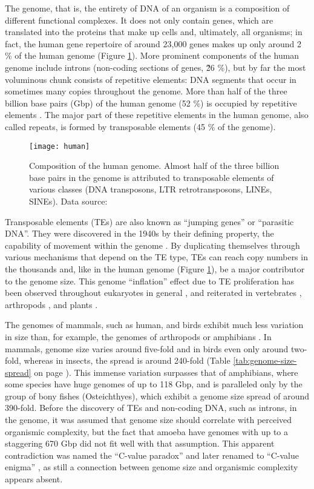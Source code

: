 The genome, that is, the entirety of DNA of an organism is a composition
of different functional complexes. It does not only contain genes, which
are translated into the proteins that make up cells and, ultimately, all
organisms; in fact, the human gene repertoire of around 23,000 genes
makes up only around 2 \% of the human genome \citep{Makalowski2001}
(Figure \ref{fig:human-genome}). More prominent components of the human
genome include introns (non-coding sections of genes, \~26 \%), but by
far the most voluminous chunk consists of repetitive elements: DNA
segments that occur in sometimes many copies throughout the genome.
More than half of the three billion base pairs (Gbp) of the human genome
(52 \%) is occupied by repetitive elements \citep{Lander2001}. The major
part of these repetitive elements in the human genome, also called
repeats, is formed by transposable elements (45 \% of the genome).

\begin{figure}
\centering
\texttt{[image: human]}
\caption{Composition of the human genome. Almost half of the three
billion base pairs in the genome is attributed to transposable elements
of various classes (DNA transposons, LTR retrotransposons, LINEs,
SINEs). Data source: \citet{Lander2001}}
\label{fig:human-genome}
\end{figure}

Transposable elements (TEs) are also known as ``jumping genes'' or
``parasitic DNA''. They were discovered in the 1940s by their defining
property, the capability of movement within the genome
\citep{McClintock1950}. By duplicating themselves through various
mechanisms that depend on the TE type, TEs can reach copy numbers in the
thousands \citep{Petersen2018} and, like in the human genome (Figure
\ref{fig:human-genome}), be a major contributor to the genome size. This
genome ``inflation'' effect due to TE proliferation has been observed
throughout eukaryotes in general \citep{Chenais2012}, and reiterated in
vertebrates \citep{Chalopin2015}, arthropods \citep{Petersen2018}, and
plants \citep{Staton2015}. 

The genomes of mammals, such as human, and birds exhibit much less
variation in size than, for example, the genomes of arthropods or 
amphibians \citep{Gregory2005}. In mammals, genome size varies around
five-fold and in birds even only around two-fold, whereas in insects,
the spread is around 240-fold (Table \ref{tab:genome-size-spread} on page
\pageref{tab:genome-size-spread}). This immense variation surpasses that
of amphibians, where some species have huge genomes of up to 118 Gbp, and
is paralleled only by the group of bony fishes (Osteichthyes), which
exhibit a genome size spread of around 390-fold. Before the discovery of
TEs and non-coding DNA, such as introns, in the genome, it was assumed
that genome size should correlate with perceived organismic complexity,
but the fact that amoeba have genomes with up to a staggering 670 Gbp
\citep{Parfrey2008} did not fit well with that assumption. This apparent
contradiction was named the ``C-value paradox'' and later renamed to
``C-value enigma'' \citep{Gregory2007}, as still a connection between
genome size and organismic complexity appears absent.

